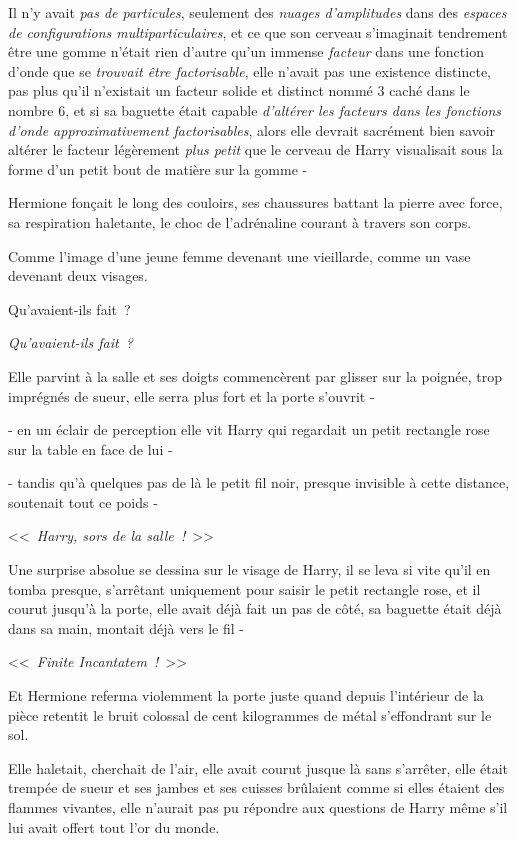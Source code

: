 Il n'y avait \emph{pas de particules}, seulement des \emph{nuages d'amplitudes} dans des \emph{espaces de configurations multiparticulaires}, et ce que son cerveau s'imaginait tendrement être une gomme n'était rien d'autre qu'un immense \emph{facteur} dans une fonction d'onde que se \emph{trouvait être factorisable}, elle n'avait pas une existence distincte, pas plus qu'il n'existait un facteur solide et distinct nommé 3 caché dans le nombre 6, et si sa baguette était capable \emph{d'altérer les facteurs dans les fonctions d'onde approximativement factorisables}, alors elle devrait sacrément bien savoir altérer le facteur légèrement \emph{plus petit} que le cerveau de Harry visualisait sous la forme d'un petit bout de matière sur la gomme -

\later

Hermione fonçait le long des couloirs, ses chaussures battant la pierre avec force, sa respiration haletante, le choc de l'adrénaline courant à travers son corps.

Comme l'image d'une jeune femme devenant une vieillarde, comme un vase devenant deux visages.

Qu'avaient-ils fait~?

\emph{Qu'avaient-ils fait~?}

Elle parvint à la salle et ses doigts commencèrent par glisser sur la poignée, trop imprégnés de sueur, elle serra plus fort et la porte s'ouvrit -

- en un éclair de perception elle vit Harry qui regardait un petit rectangle rose sur la table en face de lui -

- tandis qu'à quelques pas de là le petit fil noir, presque invisible à cette distance, soutenait tout ce poids -

<<~\emph{Harry, sors de la salle~!}~>>

Une surprise absolue se dessina sur le visage de Harry, il se leva si vite qu'il en tomba presque, s'arrêtant uniquement pour saisir le petit rectangle rose, et il courut jusqu'à la porte, elle avait déjà fait un pas de côté, sa baguette était déjà dans sa main, montait déjà vers le fil -

<<~\emph{Finite Incantatem~!}~>>

Et Hermione referma violemment la porte juste quand depuis l'intérieur de la pièce retentit le bruit colossal de cent kilogrammes de métal s'effondrant sur le sol.

Elle haletait, cherchait de l'air, elle avait courut jusque là sans s'arrêter, elle était trempée de sueur et ses jambes et ses cuisses brûlaient comme si elles étaient des flammes vivantes, elle n'aurait pas pu répondre aux questions de Harry même s'il lui avait offert tout l'or du monde.


